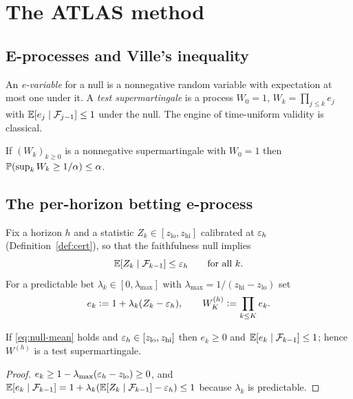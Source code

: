 \section{The ATLAS method}\label{sec:method}

\subsection{E-processes and Ville's inequality}

An \emph{e-variable} for a null is a nonnegative random variable with expectation at most one under
it. A \emph{test supermartingale} is a process $W_0=1$, $W_k=\prod_{j\le k}e_j$ with $\mathbb{E}[e_j\mid\mathcal{F}_{j-1}]\le1$
under the null. The engine of time-uniform validity is classical.

\begin{lemma}\label{lem:ville}
If $(W_k)_{k\ge0}$ is a nonnegative supermartingale with $W_0=1$ then $\mathbb{P}(\sup_kW_k\ge1/\alpha)\le\alpha$.
\end{lemma}

\subsection{The per-horizon betting e-process}\label{sec:betting}

Fix a horizon $h$ and a statistic $Z_k\in[z_{\mathrm{lo}},z_{\mathrm{hi}}]$ calibrated at $\varepsilon_h$
(Definition~\ref{def:cert}), so that the faithfulness null implies
\begin{equation}\label{eq:null-mean}
\mathbb{E}[Z_k\mid\mathcal{F}_{k-1}]\le\varepsilon_h\qquad\text{for all }k.
\end{equation}
For a predictable bet $\lambda_k\in[0,\lambda_{\max}]$ with $\lambda_{\max}=1/(z_{\mathrm{hi}}-z_{\mathrm{lo}})$ set
\begin{equation}\label{eq:evar}
e_k\vcentcolon=1+\lambda_k(Z_k-\varepsilon_h),\qquad W^{(h)}_K\vcentcolon=\prod_{k\le K}e_k .
\end{equation}

\begin{proposition}\label{prop:evar}
If \eqref{eq:null-mean} holds and $\varepsilon_h\in[z_{\mathrm{lo}},z_{\mathrm{hi}}]$ then $e_k\ge0$ and
$\mathbb{E}[e_k\mid\mathcal{F}_{k-1}]\le1$; hence $W^{(h)}$ is a test supermartingale.
\end{proposition}
\begin{proof}
$e_k\ge1-\lambda_{\max}(\varepsilon_h-z_{\mathrm{lo}})\ge0$, and
$\mathbb{E}[e_k\mid\mathcal{F}_{k-1}]=1+\lambda_k(\mathbb{E}[Z_k\mid\mathcal{F}_{k-1}]-\varepsilon_h)\le1$ because $\lambda_k$ is predictable.
\end{proof}

